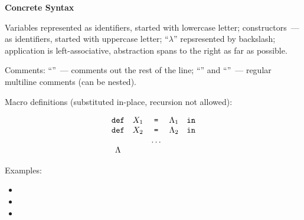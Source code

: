 \documentclass{article}
\begin{document}

\vskip 1cm
\textbf{Concrete Syntax}
\vskip 7mm

\justify

Variables represented as identifiers, started with lowercase letter; 
constructors~--- as identifiers, started with uppercase letter; ``$\lambda$'' 
repsresented by backslash; application is left-associative, abstraction spans 
to the right as far as possible.

Comments: ``\cd{--}''~--- comments out the rest of the line; ``\cd{(*}'' and 
``\cd{*)}''~--- regular multiline comments (can be nested).

Macro definitions (substituted in-place, recursion not allowed):

$$
\begin{array}{ccccc}
\mbox{\texttt{def}}&X_1& \mbox{\texttt{=}} &\Lambda_1&\mbox{\texttt{in}}\\
\mbox{\texttt{def}}&X_2& \mbox{\texttt{=}} &\Lambda_2&\mbox{\texttt{in}} \\
        &   &\ldots & & \\
\Lambda & & & &
\end{array}
$$

Examples:

\begin{itemize}
\item {}
\item {}
\item {}
\end{itemize}
\end{document}
